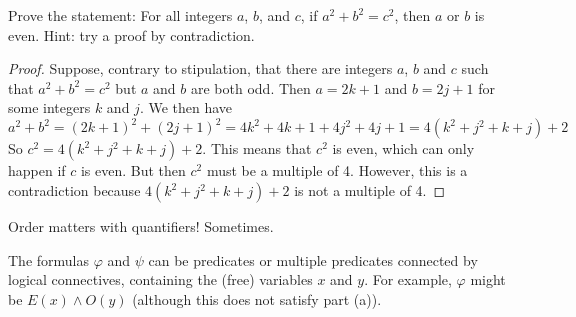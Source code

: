 \documentclass[11pt]{exam}
\def\and{\wedge}
\begin{document}
\begin{questions}
\begin{solution}
\end{solution}


\question[5] Prove the statement: For all integers $a$, $b$, and $c$, if $a^2 + b^2 = c^2$, then $a$ or $b$ is even.  Hint: try a proof by contradiction.
\begin{solution}
  \begin{proof}
    Suppose, contrary to stipulation, that there are integers $a$, $b$ and $c$ such that $a^2 + b^2 = c^2$ but $a$ and $b$ are both odd.  Then $a = 2k+1$ and $b = 2j + 1$ for some integers $k$ and $j$.  We then have
    \[a^2 + b^2 = (2k+1)^2 + (2j+1)^2 = 4k^2 + 4k + 1 + 4j^2 + 4j + 1 = 4(k^2 + j^2 + k + j) + 2\]
    So $c^2 = 4(k^2 + j^2 + k + j) + 2$.  This means that $c^2$ is even, which can only happen if $c$ is even.  But then $c^2$ must be a multiple of 4.  However, this is a contradiction because $4(k^2 + j^2 + k + j) + 2$ is not a multiple of 4.
  \end{proof}

\end{solution}


\question[4] Order matters with quantifiers! Sometimes. 
The formulas $\varphi$ and $\psi$ can be predicates or multiple predicates connected by logical connectives, containing the (free) variables $x$ and $y$.  For example, $\varphi$ might be $E(x) \and O(y)$ (although this does not satisfy part (a)).


\end{questions}
\end{document}
